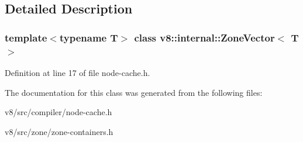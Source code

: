 \subsection{Detailed Description}
\subsubsection*{template$<$typename T$>$\newline
class v8\+::internal\+::\+Zone\+Vector$<$ T $>$}



Definition at line 17 of file node-\/cache.\+h.



The documentation for this class was generated from the following files\+:\begin{DoxyCompactItemize}
\item 
v8/src/compiler/node-\/cache.\+h\item 
v8/src/zone/zone-\/containers.\+h\end{DoxyCompactItemize}
